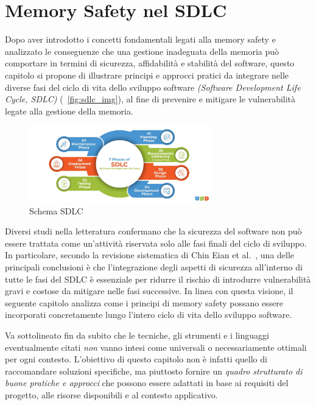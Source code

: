 \chapter{Memory Safety nel SDLC}
\label{cha:sdlc}

Dopo aver introdotto i concetti fondamentali legati alla memory safety e
analizzato le conseguenze che una gestione inadeguata della memoria può
comportare in termini di sicurezza, affidabilità e stabilità del software,
questo capitolo si propone di illustrare principi e approcci pratici da
integrare nelle diverse fasi del ciclo di vita dello sviluppo software \textit{(Software
Development Life Cycle, SDLC)} (~\autoref{fig:sdlc_img}), al fine di prevenire e
mitigare le vulnerabilità legate alla gestione della memoria.

\begin{figure}[htbp]
  \centering
  \includegraphics[width=0.7\textwidth]{images/sdlc.png}
  \caption[Schema SDLC]{Schema SDLC\protect\footnotemark}
  \label{fig:sdlc_img}
\end{figure}

Diversi studi nella letteratura confermano che la sicurezza del software non può
essere trattata come un'attività riservata solo alle fasi finali del ciclo di
sviluppo. In particolare, secondo la revisione sistematica di Chin Eian et al.~\cite{security_in_sdlc},
una delle principali conclusioni è che l'integrazione degli aspetti di sicurezza
all'interno di tutte le fasi del SDLC è essenziale per ridurre il rischio di
introdurre vulnerabilità gravi e costose da mitigare nelle fasi successive. In linea
con questa visione, il seguente capitolo analizza come i principi di memory
safety possano essere incorporati concretamente lungo l'intero ciclo di vita
dello sviluppo software.

Va sottolineato fin da subito che le tecniche, gli strumenti e i linguaggi eventualmente
citati \textit{non} vanno intesi come universali o necessariamente ottimali per
ogni contesto. L'obiettivo di questo capitolo non è infatti quello di raccomandare
soluzioni specifiche, ma piuttosto fornire un \textit{quadro strutturato di
buone pratiche e approcci} che possono essere adattati in base ai requisiti del progetto,
alle risorse disponibili e al contesto applicativo.





